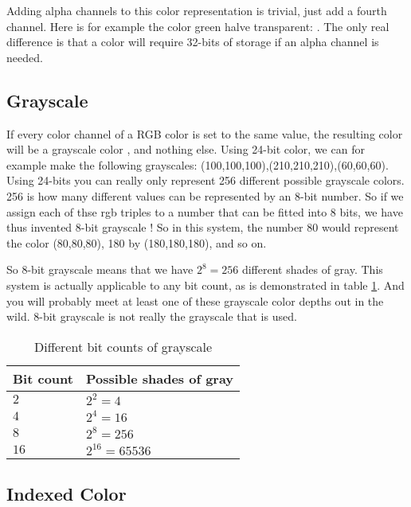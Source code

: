 \begin{refsection}
  Adding alpha channels to this color representation is trivial, just
  add a fourth channel. Here is for example the color green halve
  transparent: . The only real difference is
  that a color will require 32-bits of storage if an alpha channel is needed.

  \subsection{Grayscale}
  \label{sec:other-colors-depths}

  \newcommand{\selfrgbtrip}[3]{\textcolor[RGB]{#1,#2,#3}{(#1,#2,#3)}}
  \newcommand{\selfrgbtripgray}[1]{\selfrgbtrip{#1}{#1}{#1}}

  If every color channel of a RGB color is set to the same value, the
  resulting color will be a grayscale color ,
  and nothing else. Using 24-bit color, we can for example make the
  following grayscales:
  \selfrgbtripgray{100},\selfrgbtripgray{210},\selfrgbtripgray{60}. Using
  24-bits you can really only represent 256 different possible
  grayscale colors. 256 is how many different values can be
  represented by an 8-bit number. So if we assign each of thse rgb
  triples to a number that can be fitted into 8 bits, we have thus
  invented 8-bit grayscale ! So in this system,
  the number 80 would represent the color \selfrgbtripgray{80}, 180 by
  \selfrgbtripgray{180}, and so on. \cite{puglia00:_handbook_dig_proj}

  So 8-bit grayscale means that we have $2^8=256$ different shades of
  gray. This system is actually applicable to any bit count, as is
  demonstrated in table \ref{tab:grayscale}. And you will probably meet at least one of
  these grayscale color depths out in the wild. 8-bit grayscale is not
  really the grayscale that is used.

  \begin{table}[h!]
    \centering
    \begin{tabular}{ll}
      \toprule
      Bit count & Possible shades of gray \\
      \midrule
      $2$ & $2^2 = 4$ \\
      $4$ & $2^4 = 16$ \\
      $8$ & $2^8 = 256$ \\
      $16$ & $2^{16} = 65536$ \\
      \bottomrule
    \end{tabular}
    \caption{Different bit counts of grayscale}
    \label{tab:grayscale}
  \end{table}

  \subsection{Indexed Color}
  \label{sec:indexed-color}


  \printbibliography[heading=subbibliography]
\end{refsection}